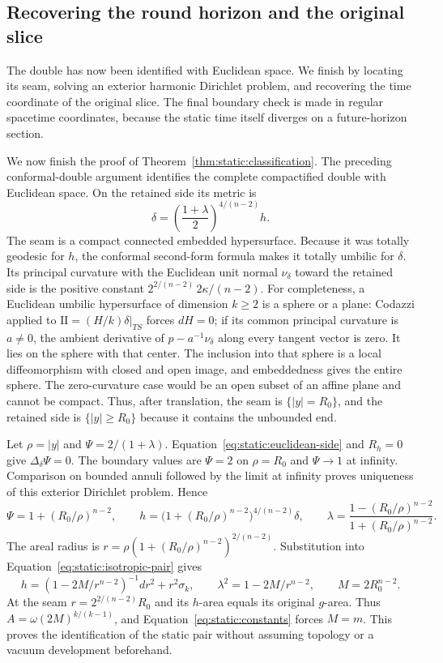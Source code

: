 

\subsection{Recovering the round horizon and the original slice}

The double has now been identified with Euclidean space.  We finish
by locating its seam, solving an exterior harmonic Dirichlet problem,
and recovering the time coordinate of the original slice.  The final
boundary check is made in regular spacetime coordinates, because the
static time itself diverges on a future-horizon section.

We now finish the proof of Theorem~\ref{thm:static:classification}.
The preceding conformal-double argument identifies the complete
compactified double with Euclidean space.  On the retained side
its metric is
\begin{equation}\label{eq:static:euclidean-side}
 \delta=\left(\frac{1+\lambda}{2}\right)^{4/(n-2)}h.
\end{equation}
The seam is a compact connected embedded hypersurface.  Because
it was totally geodesic for $h$, the conformal second-form formula
makes it totally umbilic for $\delta$.  Its principal curvature
with the Euclidean unit normal $\nu_\delta$ toward the retained side is the positive constant
$2^{2/(n-2)}\,2\kappa/(n-2)$.
For completeness, a Euclidean umbilic hypersurface of dimension
$k\geq2$ is a sphere or a plane: Codazzi applied to $\mathrm{II}=(H/k)\delta|_{TS}$
forces $dH=0$; if its common principal curvature is $a\ne0$,
the ambient derivative of $p-a^{-1}\nu_\delta$ along every tangent
vector is zero.  It lies on the sphere with that center.  The
inclusion into that sphere is a local diffeomorphism with closed
and open image, and embeddedness gives the entire sphere.
The zero-curvature case would be an open subset of an affine
plane and cannot be compact.  Thus, after translation, the seam
is $\{|y|=R_0\}$, and the retained side is $\{|y|\geq R_0\}$
because it contains the unbounded end.

Let $\rho=|y|$ and $\Psi=2/(1+\lambda)$.  Equation~\eqref{eq:static:euclidean-side}
and $R_h=0$ give $\Delta_\delta\Psi=0$.  The boundary values
are $\Psi=2$ on $\rho=R_0$ and $\Psi\to1$ at infinity.
Comparison on bounded annuli followed by the limit at infinity
proves uniqueness of this exterior Dirichlet problem.  Hence
\begin{equation}\label{eq:static:isotropic-pair}
 \Psi=1+(R_0/\rho)^{n-2},\qquad
 h=\bigl(1+(R_0/\rho)^{n-2}\bigr)^{4/(n-2)}\delta,
 \qquad
 \lambda=\frac{1-(R_0/\rho)^{n-2}}
                  {1+(R_0/\rho)^{n-2}}.
\end{equation}
The areal radius is
$r=\rho(1+(R_0/\rho)^{n-2})^{2/(n-2)}$.
Substitution into Equation~\eqref{eq:static:isotropic-pair} gives
\[
 h=(1-2M/r^{n-2})^{-1}dr^2+r^2\sigma_k,
 \qquad \lambda^2=1-2M/r^{n-2},\qquad M=2R_0^{n-2}.
\]
At the seam $r=2^{2/(n-2)}R_0$ and its $h$-area equals its
original $g$-area.  Thus
$A=\omega(2M)^{k/(k-1)}$, and
Equation~\eqref{eq:static:constants} forces $M=m$.
This proves the identification of the static pair without
assuming topology or a vacuum development beforehand.

